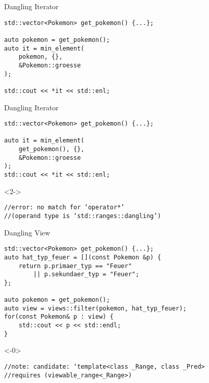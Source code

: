 \begin{frame}[fragile]{Dangling Iterator}
    \begin{overlayarea}{\linewidth}{6cm}
        \begin{verbatim}
std::vector<Pokemon> get_pokemon() {...};

auto pokemon = get_pokemon();
auto it = min_element(
    pokemon, {},
    &Pokemon::groesse
);

std::cout << *it << std::enl;
        \end{verbatim}
    \end{overlayarea}
\end{frame}

\begin{frame}[fragile]{Dangling Iterator}
    \begin{overlayarea}{\linewidth}{6cm}
        \begin{verbatim}
std::vector<Pokemon> get_pokemon() {...};

auto it = min_element(
    get_pokemon(), {},
    &Pokemon::groesse
);
std::cout << *it << std::enl;
    \end{verbatim}
        \begin{onlyenv}<2->
            \begin{verbatim}
//error: no match for ‘operator*’
//(operand type is ‘std::ranges::dangling’)
            \end{verbatim}
        \end{onlyenv}
    \end{overlayarea}
\end{frame}

\begin{frame}[fragile]{Dangling View}
    \begin{overlayarea}{\linewidth}{6cm}
        \begin{verbatim}
std::vector<Pokemon> get_pokemon() {...};
auto hat_typ_feuer = [](const Pokemon &p) { 
    return p.primaer_typ == "Feuer"
        || p.sekundaer_typ = "Feuer";
};

auto pokemon = get_pokemon();
auto view = views::filter(pokemon, hat_typ_feuer);
for(const Pokemon& p : view) {
    std::cout << p << std::endl;
}
    \end{verbatim}
        \begin{onlyenv}<-0>
            \begin{verbatim}
//note: candidate: ‘template<class _Range, class _Pred>
//requires (viewable_range<_Range>)
            \end{verbatim}
        \end{onlyenv}
    \end{overlayarea}
\end{frame}

